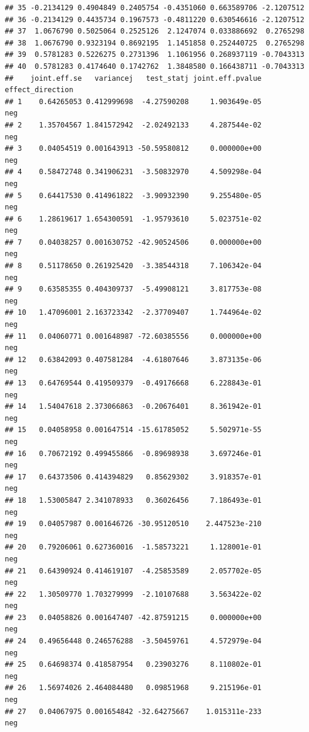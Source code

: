 \documentclass[
]{article}
\begin{document}
\begin{verbatim}
## 35 -0.2134129 0.4904849 0.2405754 -0.4351060 0.663589706 -2.1207512
## 36 -0.2134129 0.4435734 0.1967573 -0.4811220 0.630546616 -2.1207512
## 37  1.0676790 0.5025064 0.2525126  2.1247074 0.033886692  0.2765298
## 38  1.0676790 0.9323194 0.8692195  1.1451858 0.252440725  0.2765298
## 39  0.5781283 0.5226275 0.2731396  1.1061956 0.268937119 -0.7043313
## 40  0.5781283 0.4174640 0.1742762  1.3848580 0.166438711 -0.7043313
##    joint.eff.se   variancej   test_statj joint.eff.pvalue effect_direction
## 1    0.64265053 0.412999698  -4.27590208     1.903649e-05              neg
## 2    1.35704567 1.841572942  -2.02492133     4.287544e-02              neg
## 3    0.04054519 0.001643913 -50.59580812     0.000000e+00              neg
## 4    0.58472748 0.341906231  -3.50832970     4.509298e-04              neg
## 5    0.64417530 0.414961822  -3.90932390     9.255480e-05              neg
## 6    1.28619617 1.654300591  -1.95793610     5.023751e-02              neg
## 7    0.04038257 0.001630752 -42.90524506     0.000000e+00              neg
## 8    0.51178650 0.261925420  -3.38544318     7.106342e-04              neg
## 9    0.63585355 0.404309737  -5.49908121     3.817753e-08              neg
## 10   1.47096001 2.163723342  -2.37709407     1.744964e-02              neg
## 11   0.04060771 0.001648987 -72.60385556     0.000000e+00              neg
## 12   0.63842093 0.407581284  -4.61807646     3.873135e-06              neg
## 13   0.64769544 0.419509379  -0.49176668     6.228843e-01              neg
## 14   1.54047618 2.373066863  -0.20676401     8.361942e-01              neg
## 15   0.04058958 0.001647514 -15.61785052     5.502971e-55              neg
## 16   0.70672192 0.499455866  -0.89698938     3.697246e-01              neg
## 17   0.64373506 0.414394829   0.85629302     3.918357e-01              neg
## 18   1.53005847 2.341078933   0.36026456     7.186493e-01              neg
## 19   0.04057987 0.001646726 -30.95120510    2.447523e-210              neg
## 20   0.79206061 0.627360016  -1.58573221     1.128001e-01              neg
## 21   0.64390924 0.414619107  -4.25853589     2.057702e-05              neg
## 22   1.30509770 1.703279999  -2.10107688     3.563422e-02              neg
## 23   0.04058826 0.001647407 -42.87591215     0.000000e+00              neg
## 24   0.49656448 0.246576288  -3.50459761     4.572979e-04              neg
## 25   0.64698374 0.418587954   0.23903276     8.110802e-01              neg
## 26   1.56974026 2.464084480   0.09851968     9.215196e-01              neg
## 27   0.04067975 0.001654842 -32.64275667    1.015311e-233              neg

\end{verbatim}
\end{document}
